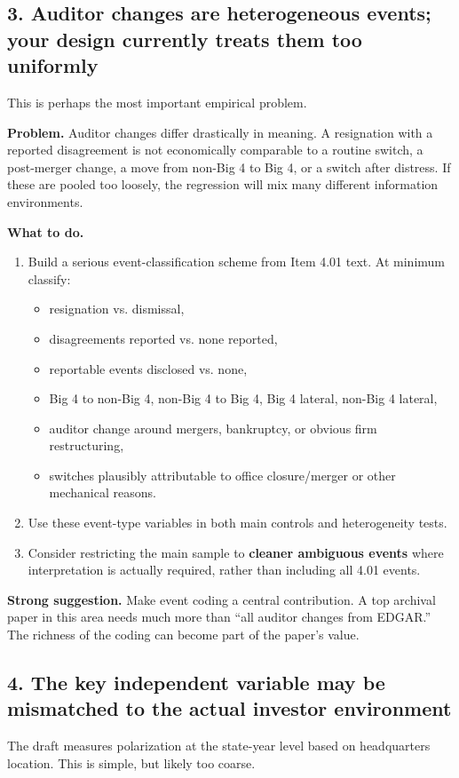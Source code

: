 \documentclass[12pt]{article}
\begin{document}
\subsection{3. Auditor changes are heterogeneous events; your design currently treats them too uniformly}
This is perhaps the most important empirical problem.

\textbf{Problem.} Auditor changes differ drastically in meaning. A resignation with a reported disagreement is not economically comparable to a routine switch, a post-merger change, a move from non-Big 4 to Big 4, or a switch after distress. If these are pooled too loosely, the regression will mix many different information environments.

\textbf{What to do.}
\begin{enumerate}[leftmargin=2em]
    \item Build a serious event-classification scheme from Item 4.01 text. At minimum classify:
    \begin{itemize}[leftmargin=2em]
        \item resignation vs.
        dismissal,
        \item disagreements reported vs.
        none reported,
        \item reportable events disclosed vs.
        none,
        \item Big 4 to non-Big 4, non-Big 4 to Big 4, Big 4 lateral, non-Big 4 lateral,
        \item auditor change around mergers, bankruptcy, or obvious firm restructuring,
        \item switches plausibly attributable to office closure/merger or other mechanical reasons.
    \end{itemize}
    \item Use these event-type variables in both main controls and heterogeneity tests.
    \item Consider restricting the main sample to \textbf{cleaner ambiguous events} where interpretation is actually required, rather than including all 4.01 events.
\end{enumerate}

\textbf{Strong suggestion.} Make event coding a central contribution. A top archival paper in this area needs much more than ``all auditor changes from EDGAR.'' The richness of the coding can become part of the paper's value.

\subsection{4. The key independent variable may be mismatched to the actual investor environment}
The draft measures polarization at the state-year level based on headquarters location. This is simple, but likely too coarse.
\end{document}
